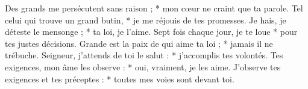 Des grands me persécutent sans raison ; *
mon cœur ne craint que ta parole.
\versseparator
Tel celui qui trouve un grand butin, *
je me réjouis de tes promesses.
\versseparator
Je hais, je déteste le mensonge ; *
ta loi, je l’aime.
\versseparator
Sept fois chaque jour, je te loue *
pour tes justes décisions.
\versseparator
Grande est la paix de qui aime ta loi ; *
jamais il ne trébuche.
\versseparator
Seigneur, j’attends de toi le salut : *
j’accomplis tes volontés.
\versseparator
Tes exigences, mon âme les observe : *
oui, vraiment, je les aime.
\versseparator
J’observe tes exigences et tes préceptes : *
toutes mes voies sont devant toi.

